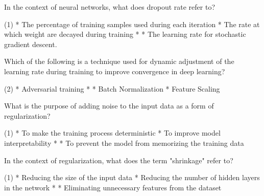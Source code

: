 \documentclass[11pt]{extarticle}
\begin{document}
\begin{exercise}
    In the context of neural networks, what does dropout rate refer to?
    \begin{choice}(1)
        * The percentage of training samples used during each iteration
        * The rate at which weight are decayed during training
        * 
        * The learning rate for stochastic gradient descent.
    \end{choice}
\end{exercise}
\begin{solution}
\end{solution}

\begin{exercise}
    Which of the following is a technique used for dynamic adjustment of the learning rate during training to improve convergence in deep learning?
    \begin{choice}(2)
        * Adversarial training
        * 
        * Batch Normalization
        * Feature Scaling
    \end{choice}
\end{exercise}
\begin{solution}
\end{solution}

\begin{exercise}
    What is the purpose of adding noise to the input data as a form of regularization?
    \begin{choice} (1)
        * To make the training process deterministic
        * To improve model interpretability
        * 
        * To prevent the model from memorizing the training data
    \end{choice}
\end{exercise}
\begin{solution}
\end{solution}

\begin{exercise}
    In the context of regularization, what does the term "shrinkage" refer to?
    \begin{choice} (1)
        * Reducing the size of the input data
        * Reducing the number of hidden layers in the network
        * 
        * Eliminating unnecessary features from the dataset
    \end{choice}
\end{exercise}
\begin{solution}
\end{solution}
\end{document}
